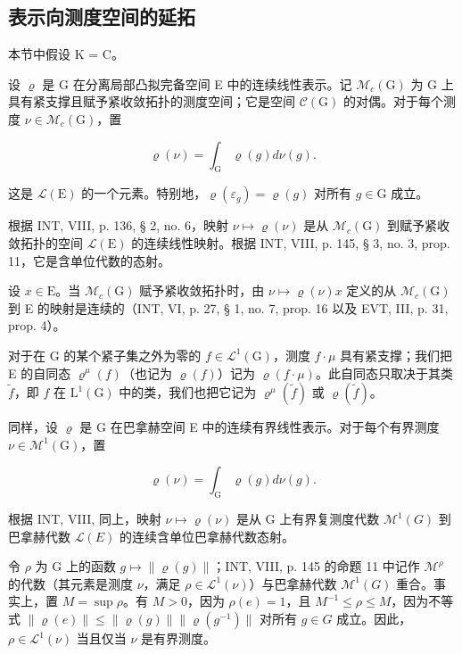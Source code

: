 \subsection{表示向测度空间的延拓}

本节中假设 K = C。

设 \(\varrho\) 是 G 在分离局部凸拟完备空间 E 中的连续线性表示。记 \(\mathcal{M}_{c}(\mathrm{G})\) 为 G 上具有紧支撑且赋予紧收敛拓扑的测度空间；它是空间 \(\mathcal{C}(\mathrm{G})\) 的对偶。对于每个测度 \(\nu \in \mathcal{M}_{c}(\mathrm{G})\)，置

\[
\varrho (\nu) = \int_ {\mathrm{G}} \varrho (g) d \nu (g).
\]

这是 \(\mathcal{L}(\mathrm{E})\) 的一个元素。特别地，\(\varrho(\varepsilon_g) = \varrho(g)\) 对所有 \(g \in \mathrm{G}\) 成立。

根据 INT, VIII, p. 136, § 2, no. 6，映射 \(\nu \mapsto \varrho(\nu)\) 是从 \(\mathcal{M}_c(\mathrm{G})\) 到赋予紧收敛拓扑的空间 \(\mathcal{L}(\mathrm{E})\) 的连续线性映射。根据 INT, VIII, p. 145, § 3, no. 3, prop. 11，它是含单位代数的态射。

设 \(x \in \mathrm{E}\)。当 \(\mathcal{M}_c(\mathrm{G})\) 赋予紧收敛拓扑时，由 \(\nu \mapsto \varrho(\nu)x\) 定义的从 \(\mathcal{M}_c(\mathrm{G})\) 到 E 的映射是连续的（INT, VI, p. 27, § 1, no. 7, prop. 16 以及 EVT, III, p. 31, prop. 4）。

对于在 G 的某个紧子集之外为零的 \(f \in \mathcal{L}^{1}(\mathrm{G})\)，测度 \(f \cdot \mu\) 具有紧支撑；我们把 E 的自同态 \(\varrho^{\mu}(f)\)（也记为 \(\varrho(f)\)）记为 \(\varrho(f \cdot \mu)\)。此自同态只取决于其类 \(\widetilde{f}\)，即 \(f\) 在 \(\mathrm{L}^{1}(\mathrm{G})\) 中的类，我们也把它记为 \(\varrho^{\mu}(\widetilde{f})\) 或 \(\varrho(\widetilde{f})\)。

同样，设 \(\varrho\) 是 G 在巴拿赫空间 E 中的连续有界线性表示。对于每个有界测度 \(\nu \in \mathcal{M}^{1}(\mathrm{G})\)，置

\[
\varrho (\nu) = \int_ {\mathrm{G}} \varrho (g) d \nu (g).
\]

根据 INT, VIII, 同上，映射 \(\nu \mapsto \varrho(\nu)\) 是从 G 上有界复测度代数 \(\mathcal{M}^{1}(G)\) 到巴拿赫代数 \(\mathcal{L}(E)\) 的连续含单位巴拿赫代数态射。

令 \(\rho\) 为 G 上的函数 \(g\mapsto\|\varrho(g)\|\)；INT, VIII, p. 145 的命题 11 中记作 \(\mathcal{M}^{\rho}\) 的代数（其元素是测度 \(\nu\)，满足 \(\rho\in\mathcal{L}^{1}(\nu)\)）与巴拿赫代数 \(\mathcal{M}^{1}(G)\) 重合。事实上，置 \(M = \sup \rho\)。有 \(M > 0\)，因为 \(\rho(e)=1\)，且 \(M^{-1} \leqslant \rho \leqslant M\)，因为不等式 \(\|\varrho(e)\|\leqslant\|\varrho(g)\|\|\varrho(g^{-1})\|\) 对所有 \(g\in G\) 成立。因此，\(\rho\in\mathcal{L}^{1}(\nu)\) 当且仅当 \(\nu\) 是有界测度。

